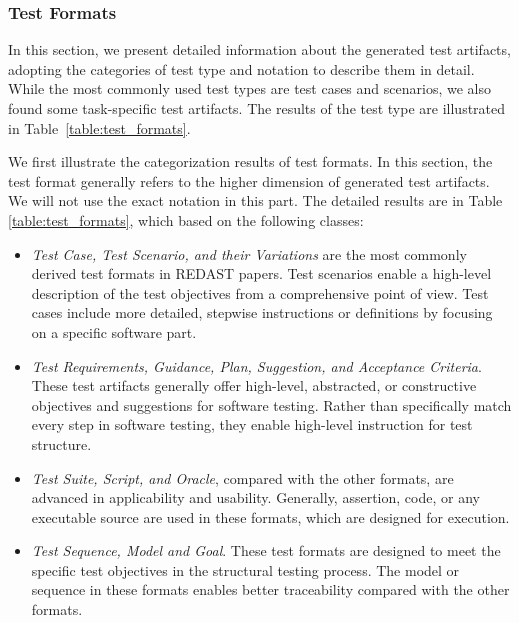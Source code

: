 \subsubsection{Test Formats}

In this section, we present detailed information about the generated test artifacts, adopting the categories of test type and notation to describe them in detail. While the most commonly used test types are test cases and scenarios, we also found some task-specific test artifacts. The results of the test type are illustrated in Table~\ref{table:test_formats}.


We first illustrate the categorization results of test formats. In this section, the test format generally refers to the higher dimension of generated test artifacts. We will not use the exact notation in this part. The detailed results are in Table \ref{table:test_formats}, which based on the following classes:
\begin{itemize}
    \item \textit{Test Case, Test Scenario, and their Variations} are the most commonly derived test formats in REDAST papers. Test scenarios enable a high-level description of the test objectives from a comprehensive point of view. Test cases include more detailed, stepwise instructions or definitions by focusing on a specific software part.
    \item \textit{Test Requirements, Guidance, Plan, Suggestion, and Acceptance Criteria}. These test artifacts generally offer high-level, abstracted, or constructive objectives and suggestions for software testing. Rather than specifically match every step in software testing, they enable high-level instruction for test structure.
    \item \textit{Test Suite, Script, and Oracle}, compared with the other formats, are advanced in applicability and usability. Generally, assertion, code, or any executable source are used in these formats, which are designed for execution.
    \item \textit{Test Sequence, Model and Goal}. These test formats are designed to meet the specific test objectives in the structural testing process. The model or sequence in these formats enables better traceability compared with the other formats.
\end{itemize}

